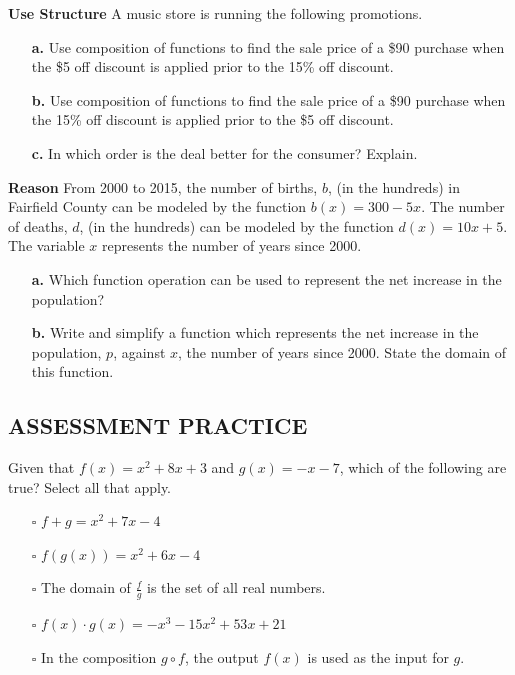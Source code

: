 \documentclass{article}
\newenvironment{practice}[2]{}{}
\newcommand{\placeholder}[2]{}
\begin{document}
\begin{practice}{32}{}
\textbf{Use Structure} A music store is running the following promotions.

\placeholder{illustration}{A drum set with a sign: "HUGE SAVINGS AT O'RILEY'S MUSIC". Coupons show "\$5 off a purchase of \$20 or more" and "Save an additional 15\% off your total purchase when you open a charge account".}

\begin{enumerate}
\item[\textbf{a.}] Use composition of functions to find the sale price of a \$90 purchase when the \$5 off discount is applied prior to the 15\% off discount.
\item[\textbf{b.}] Use composition of functions to find the sale price of a \$90 purchase when the 15\% off discount is applied prior to the \$5 off discount.
\item[\textbf{c.}] In which order is the deal better for the consumer? Explain.
\end{enumerate}
\end{practice}

\begin{practice}{33}{}
\textbf{Reason} From 2000 to 2015, the number of births, $b$, (in the hundreds) in Fairfield County can be modeled by the function $b(x) = 300 - 5x$. The number of deaths, $d$, (in the hundreds) can be modeled by the function $d(x) = 10x + 5$. The variable $x$ represents the number of years since 2000.
\begin{enumerate}
\item[\textbf{a.}] Which function operation can be used to represent the net increase in the population?
\item[\textbf{b.}] Write and simplify a function which represents the net increase in the population, $p$, against $x$, the number of years since 2000. State the domain of this function.
\end{enumerate}
\end{practice}

\subsection*{ASSESSMENT PRACTICE}

\begin{practice}{34}{}
Given that $f(x) = x^2 + 8x + 3$ and $g(x) = -x - 7$, which of the following are true? Select all that apply.
\begin{itemize}
\item[$\square$] $f + g = x^2 + 7x - 4$
\item[$\square$] $f(g(x)) = x^2 + 6x - 4$
\item[$\square$] The domain of $\frac{f}{g}$ is the set of all real numbers.
\item[$\square$] $f(x) \cdot g(x) = -x^3 - 15x^2 + 53x + 21$
\item[$\square$] In the composition $g \circ f$, the output $f(x)$ is used as the input for $g$.
\end{itemize}
\end{practice}
\end{document}
